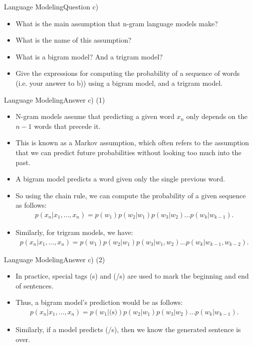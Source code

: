 \documentclass[t]{beamer}
\begin{document}
\begin{frame}{Language Modeling}{Question c)}
    \begin{itemize}
        \item What is the main assumption that n-gram language models make?
        \item What is the name of this assumption?
        \item What is a bigram model? And a trigram model?
        \item Give the expressions for computing the probability of a sequence
              of words (i.e. your answer to b)) using a bigram model, and a
              trigram model.
    \end{itemize}
\end{frame}

\begin{frame}{Language Modeling}{Answer c) (1)}
    \begin{itemize}
        \item N-gram models assume that predicting a given word $x_n$ only
              depends on the $n-1$ words that precede it.
        \item This is known as a Markov assumption, which often refers to the
              assumption that we can predict future probabilities without
              looking too much into the past.
        \item A bigram model predicts a word given only the single previous
              word.
        \item So using the chain rule, we can compute the probability of a given
              sequence as follows:
              \begin{align*}
                  p(x_n|x_1,\ldots,x_n) = p(w_1)p(w_2|w_1)p(w_3|w_2)\ldots p(w_k|w_{k-1}).
              \end{align*}
        \item Similarly, for trigram models, we have:
              \begin{align*}
                  p(x_n|x_1,\ldots,x_n) = p(w_1)p(w_2|w_1)p(w_3|w_1,w_2)\ldots p(w_k|w_{k-1},w_{k-2}).
              \end{align*}
    \end{itemize}
\end{frame}

\begin{frame}{Language Modeling}{Answer c) (2)}
    \begin{itemize}
        \item In practice, special tags (s) and (/s) are used to mark the
              beginning and end of sentences.
        \item Thus, a bigram model's prediction would be as follows:
              \begin{align*}
                  p(x_n|x_1,\ldots,x_n) = p(w_1|\text{(s)})p(w_2|w_1)p(w_3|w_2)\ldots p(w_k|w_{k-1}).
              \end{align*}
        \item Similarly, if a model predicts (/s), then we know the generated
              sentence is over.
    \end{itemize}
\end{frame}
\end{document}
